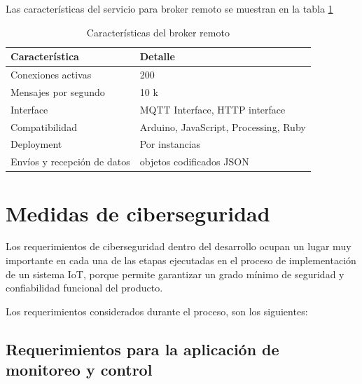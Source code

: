 Las características del servicio para broker remoto se muestran en la tabla  \ref{tab:brokerremoto}

\begin{table}[h]
	\centering
	\caption[Características del broker remoto]{Características del broker remoto}
	\begin{tabular}{p{5cm} p{7cm} }    
		\toprule
		\textbf{Característica} 	 & \textbf{Detalle}  \\
		\midrule
		Conexiones activas  & 200\\		
		Mensajes por segundo & 10 k \\
		Interface  & MQTT Interface, HTTP interface\\		
		Compatibilidad & Arduino, JavaScript, Processing, Ruby \\		
		Deployment 	  & Por instancias\\
		Envíos y recepción de datos & objetos codificados JSON\\
		
		\bottomrule
		\hline
	\end{tabular}
	\label{tab:brokerremoto}
\end{table}

\section{Medidas de ciberseguridad}

Los requerimientos de ciberseguridad dentro del desarrollo ocupan un lugar muy importante en cada una de las etapas ejecutadas en el proceso de implementación de un sistema IoT, porque permite garantizar un grado mínimo de seguridad y confiabilidad funcional del producto. 

Los requerimientos considerados durante el proceso, son los siguientes:

\subsection{Requerimientos para la aplicación de monitoreo y control}

